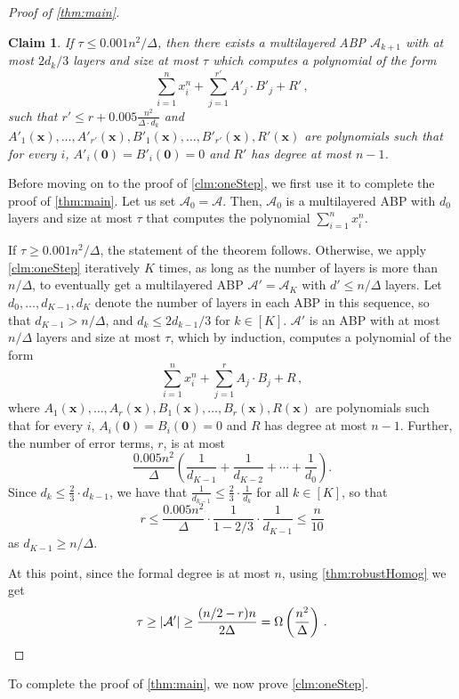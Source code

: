 \documentclass[10pt,a4paper]{article}
\newtheorem{claim}[theorem]{Claim}
\newcommand{\vx}{\mathbf x}
\newcommand{\abs}[1]{\left|#1\right|}
\newcommand{\inparen}[1]{\left(#1\right)}
\begin{document}
\begin{proof}[Proof of \autoref{thm:main}]
\begin{claim}
		If $\tau \leq 0.001 n^2/\Delta$, then there exists a multilayered ABP $\mathcal{A}_{k+1}$ with at most $2 d_k/3$ layers and size at most $\tau$ which computes a polynomial of the form 
		\[\sum_{i = 1}^n x_i^n + \sum_{j = 1}^{r'} A'_j\cdot B'_j + R'\, ,\]
		such that $r' \leq  r + 0.005\frac{n^2}{\Delta \cdot d_k}$ and $A'_1(\vx), \ldots, A'_{r'}(\vx), B'_1(\vx), \ldots, B'_{r'}(\vx), R'(\vx)$ are polynomials such that for every $i$, $A'_i(\mathbf{0}) = B'_i(\mathbf{0}) = 0$ and $R'$ has degree at most $n-1$.
	\end{claim}
	
	Before moving on to the proof of  \autoref{clm:oneStep}, we first use it to complete the proof of  \autoref{thm:main}. Let us set $\mathcal{A}_0 = \mathcal{A}$. Then, $\mathcal{A}_0$ is a multilayered ABP with $d_0$ layers and size at most $\tau $ that computes the polynomial $\sum_{i = 1}^n x_i^n$.
		
	If $\tau \geq 0.001 n^2/\Delta$, the statement of the theorem follows. Otherwise, we apply \autoref{clm:oneStep} iteratively $K$ times, as long as the number of layers is more than $n/\Delta$, to  eventually get a multilayered ABP $\mathcal{A}' = \mathcal{A}_{K}$ with $d' \le n/\Delta$ layers. Let $d_0, \ldots, d_{K-1},d_K$ denote the number of layers in each ABP in this sequence, so that $d_{K-1} > n/\Delta$, and $d_k \le 2 d_{k-1}/3$ for $k \in [K]$.  $\mathcal{A}'$ is an ABP with at most $n/\Delta$ layers and size at most $\tau$, which by induction, computes a polynomial of the form
	\[\sum_{i = 1}^n x_i^n + \sum_{j = 1}^r A_j\cdot B_j + R \, ,\]
	where $A_1(\vx), \ldots, A_r(\vx), B_1(\vx), \ldots, B_r(\vx), R(\vx)$ are polynomials such that for every $i$, $A_i(\mathbf{0}) = B_i(\mathbf{0}) = 0$ and $R$ has degree at most $n-1$. Further, the number of error terms, $r$, is at most 
	\[
 		\frac{0.005 n^2} {\Delta} \left( \frac{1}{d_{K-1}} + \frac{1}{d_{K-2}} + \cdots + \frac{1}{d_0} \right).
	\]
	Since $d_k \le \frac{2}{3} \cdot d_{k-1}$, we have that $\frac{1}{d_{k-1}} \le \frac{2}{3} \cdot \frac{1}{d_k}$ for all $k \in [K]$, so that
\[
r \le \frac{0.005n^2}{\Delta} \cdot \frac{1}{1-2/3} \cdot \frac{1}{d_{K-1}} \le \frac{n}{10}
\]
as $d_{K-1} \ge n/\Delta$.	

	At this point, since the formal degree is at most $n$, using \autoref{thm:robustHomog} we get 
	\[
		\tau \geq \abs{\mathcal{A}'} \geq \dfrac{(n/2-r)n}{2\Delta} = \Omega \inparen{\dfrac{n^2}{\Delta}} \, . \qedhere 
	\]
\end{proof}
		
To complete the proof of  \autoref{thm:main}, we now prove \autoref{clm:oneStep}.
\end{document}
